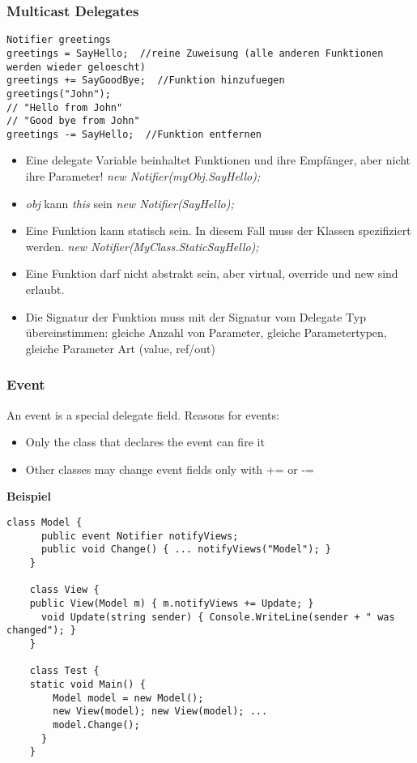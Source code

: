 \subsubsection{Multicast Delegates}
\begin{lstlisting}
Notifier greetings
greetings = SayHello;  //reine Zuweisung (alle anderen Funktionen werden wieder geloescht)
greetings += SayGoodBye;  //Funktion hinzufuegen
greetings("John");
// "Hello from John"
// "Good bye from John"
greetings -= SayHello;  //Funktion entfernen
\end{lstlisting}

\begin{itemize}
  \item  Eine delegate Variable beinhaltet Funktionen und ihre Empfänger, aber nicht ihre Parameter!\newline
         \textit{new Notifier(myObj.SayHello);}
  \item  \textit{obj} kann \textit{this} sein \newline
         \textit{new Notifier(SayHello);}
  \item  Eine Funktion kann statisch sein. In diesem Fall muss der Klassen spezifiziert werden. \newline
         \textit{new Notifier(MyClass.StaticSayHello);}
  \item  Eine Funktion darf nicht abstrakt sein, aber virtual, override und new sind erlaubt.
  \item  Die Signatur der Funktion muss mit der Signatur vom Delegate Typ übereinstimmen:
			     gleiche Anzahl von Parameter, gleiche Parametertypen, gleiche Parameter Art (value, ref/out)
\end{itemize}

\subsubsection{Event}
An event is a special delegate field. Reasons for events:
\begin{itemize}
  \item Only the class that declares the event can fire it
  \item Other classes may change event fields only with += or -=
\end{itemize}

\textbf{Beispiel}
\begin{lstlisting}[style=Csharp]
	class Model {
	  public event Notifier notifyViews;
	  public void Change() { ... notifyViews("Model"); }
	}
	
	class View {
  	public View(Model m) { m.notifyViews += Update; }
	  void Update(string sender) { Console.WriteLine(sender + " was changed"); }
	}
	
	class Test {
  	static void Main() {
    	Model model = new Model();
	    new View(model); new View(model); ...
	    model.Change();
	  }
	}
\end{lstlisting}

